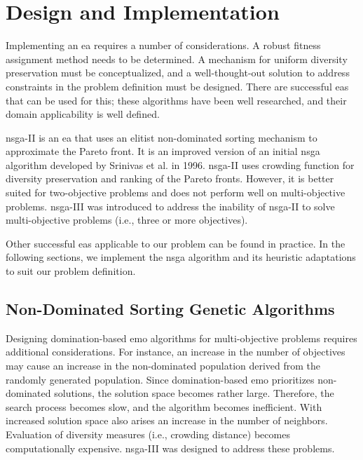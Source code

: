 \chapter{Design and Implementation}\label{chapter:prototype_implementation}

Implementing an \gls{ea} requires a number of considerations. A robust fitness assignment method needs to be determined. A mechanism for uniform diversity preservation must be conceptualized, and a well-thought-out solution to address constraints in the problem definition must be designed. There are successful \glspl{ea} that can be used for this; these algorithms have been well researched, and their domain applicability is well defined.

\Gls{nsga}-II \parencite{Jain2013AnOptimization} is an \gls{ea} that uses an elitist non-dominated sorting mechanism to approximate the Pareto front. It is an improved version of an initial \gls{nsga} algorithm developed by Srinivas et al. \parencite{Srinivas1994MuiltiobjectiveAlgorithms} in 1996. 
\Gls{nsga}-II uses crowding function for diversity preservation and ranking of the Pareto fronts. However, it is better suited for two-objective problems and does not perform well on multi-objective problems. \Gls{nsga}-III \parencite{Mkaouer2015Many-objectiveNSGA-III} was introduced to address the inability of \gls{nsga}-II to solve multi-objective problems (i.e., three or more objectives).

Other successful \glspl{ea} applicable to our problem can be found in practice. In the following sections, we implement the \gls{nsga} algorithm and its heuristic adaptations to suit our problem definition.

\section{Non-Dominated Sorting Genetic Algorithms}
Designing domination-based \gls{emo} algorithms for multi-objective problems requires additional considerations. For instance, an increase in the number of objectives may cause an increase in the non-dominated population derived from the randomly generated population. Since domination-based \gls{emo} prioritizes non-dominated solutions, the solution space becomes rather large. Therefore, the search process becomes slow, and the algorithm becomes inefficient. With increased solution space also arises an increase in the number of neighbors. Evaluation of diversity measures (i.e., crowding distance) becomes computationally expensive. \Gls{nsga}-III was designed to address these problems.

